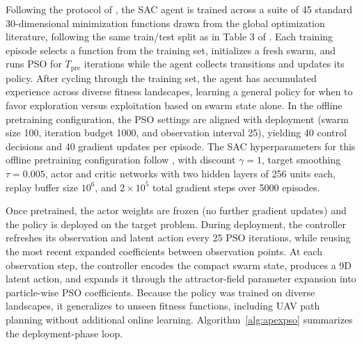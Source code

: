 \documentclass[final,5p,times]{elsarticle}
\begin{document}
Following the protocol of \cite{vonEschwege2024Soft}, the SAC agent is trained across a suite of 45 standard 30-dimensional minimization functions drawn from the global optimization literature, following the same train/test split as in Table 3 of \cite{vonEschwege2024Soft}.
Each training episode selects a function from the training set, initializes a fresh swarm, and runs PSO for $T_{\text{pre}}$ iterations while the agent collects transitions and updates its policy.
After cycling through the training set, the agent has accumulated experience across diverse fitness landscapes, learning a general policy for when to favor exploration versus exploitation based on swarm state alone.
In the offline pretraining configuration, the PSO settings are aligned with deployment (swarm size 100, iteration budget 1000, and observation interval 25), yielding 40 control decisions and 40 gradient updates per episode.
The SAC hyperparameters for this offline pretraining configuration follow \cite{vonEschwege2024Soft}, with discount $\gamma=1$, target smoothing $\tau=0.005$, actor and critic networks with two hidden layers of 256 units each, replay buffer size $10^6$, and $2\times10^5$ total gradient steps over 5000 episodes.

Once pretrained, the actor weights are frozen (no further gradient updates) and the policy is deployed on the target problem.
During deployment, the controller refreshes its observation and latent action every 25 PSO iterations, while reusing the most recent expanded coefficients between observation points.
At each observation step, the controller encodes the compact swarm state, produces a 9D latent action, and expands it through the attractor-field parameter expansion into particle-wise PSO coefficients.
Because the policy was trained on diverse landscapes, it generalizes to unseen fitness functions, including UAV path planning without additional online learning.
Algorithm~\ref{alg:apexpso} summarizes the deployment-phase loop.
\end{document}
